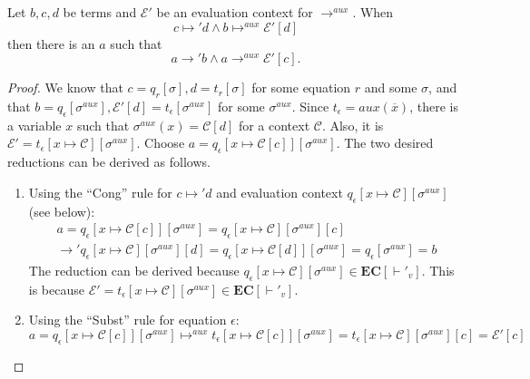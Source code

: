 \begin{lemma}
\label{lem:appinv2}
Let $b,c,d$ be terms and $\mathcal{E}'$ be an evaluation context for $\longrightarrow^{aux}$. When
\[
c \mapsto' d \land b \mapsto^{aux} \mathcal{E}'[d]
\]
then there is an $a$ such that
\[
a \longrightarrow' b \land a \longrightarrow^{aux} \mathcal{E}'[c].
\]
\begin{proof}
We know that $c = q_r[\sigma], d = t_r[\sigma]$ for some equation $r$ and some $\sigma$, and that $b = q_\epsilon[\sigma^{aux}], \mathcal{E}'[d] = t_\epsilon[\sigma^{aux}]$ for some $\sigma^{aux}$. Since $t_\epsilon = aux(\overline{x})$, there is a variable $x$ such that $\sigma^{aux}(x) = \mathcal{C}[d]$ for a context $\mathcal{C}$. Also, it is $\mathcal{E}' = t_\epsilon[x \mapsto \mathcal{C}][\sigma^{aux}]$. Choose $a = q_\epsilon[x \mapsto \mathcal{C}[c]][\sigma^{aux}]$. The two desired reductions can be derived as follows.
\begin{enumerate}
\item Using the ``Cong'' rule for $c \mapsto' d$ and evaluation context $q_\epsilon[x \mapsto \mathcal{C}][\sigma^{aux}]$ (see below):
\begin{multline*}
a = q_\epsilon[x \mapsto \mathcal{C}[c]][\sigma^{aux}] = q_\epsilon[x \mapsto \mathcal{C}][\sigma^{aux}][c] \\
\longrightarrow' q_\epsilon[x \mapsto \mathcal{C}][\sigma^{aux}][d] = q_\epsilon[x \mapsto \mathcal{C}[d]][\sigma^{aux}] = q_\epsilon[\sigma^{aux}] = b
\end{multline*}
The reduction can be derived because $q_\epsilon[x \mapsto \mathcal{C}][\sigma^{aux}] \in \mathbf{EC}[\vdash'_v]$. This is because $\mathcal{E}' = t_\epsilon[x \mapsto \mathcal{C}][\sigma^{aux}] \in \mathbf{EC}[\vdash'_v]$.

\item Using the ``Subst'' rule for equation $\epsilon$:
\[
a = q_\epsilon[x \mapsto \mathcal{C}[c]][\sigma^{aux}] \mapsto^{aux} t_\epsilon[x \mapsto \mathcal{C}[c]][\sigma^{aux}] = t_\epsilon[x \mapsto \mathcal{C}][\sigma^{aux}][c] = \mathcal{E}'[c]
\]
\end{enumerate}
\end{proof}
\end{lemma}

